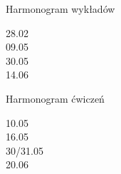 \documentclass{beamer}
\begin{document}
\begin{frame}{Harmonogram wykładów}
\begin{description}
\item[28.02] %
\item[09.05]
\item[30.05]
\item[14.06]
\end{description}
\end{frame}
\begin{frame}{Harmonogram ćwiczeń}
\begin{description}
\item[10.05] %
\item[16.05]
\item[30/31.05]
\item[20.06]
\end{description}
\end{frame}
\end{document}
